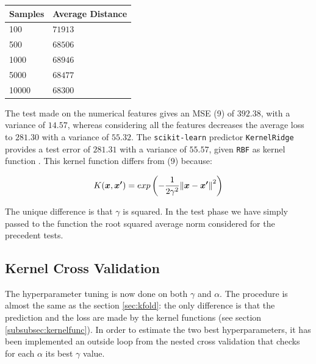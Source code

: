 \documentclass{article}
\begin{document}
\begin{table}[H]
	\label{sampletable}
	\centering
	\begin{tabular}{|l|l|}
		\hline
		Samples & Average Distance   \\ \hline
		100     & $71913$ \\ \hline
		500     & $68506$ \\ \hline
		1000    & $68946$  \\ \hline
		5000    & $68477$ \\ \hline
		10000   & $68300$  \\ \hline
	\end{tabular}
\end{table}

The test made on the numerical features gives an MSE (9) of $392.38$, with a variance of $14.57$, whereas considering all the features decreases the average loss to $281.30$ with a variance of $55.32$. The \texttt{scikit-learn} predictor \texttt{KernelRidge} provides a test error of $281.31$ with a variance of $55.57$, given \texttt{RBF} as kernel function \cite{rbf}. This kernel function differs from (9) because:

\begin{equation}
    K(\boldsymbol{x},\boldsymbol{x^\prime}) = exp \left(-\frac{1}{2\gamma^2}\norm{\boldsymbol{x}-\boldsymbol{x^\prime}}^2 \right)\hfill
\end{equation}
       
The unique difference is that $\gamma$ is squared. In the test phase we have simply passed to the function the root squared average norm considered for the precedent tests.

\subsection{Kernel Cross Validation}
The hyperparameter tuning is now done on both $\gamma$ and $\alpha$. The procedure is almost the same as the section \ref{sec:kfold}: the only difference is that the prediction and the loss are made by the kernel functions (see section \ref{subsubsec:kernelfunc}). In order to estimate the two best hyperparameters, it has been implemented an outside loop from the nested cross validation that checks for each $\alpha$ its best $\gamma$ value. 
\end{document}
